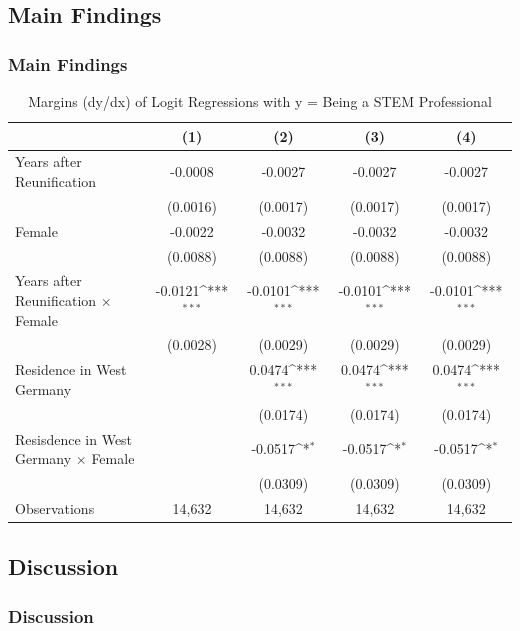 \documentclass[11pt, aspectratio=1610, xcolor={dvipsnames}]{beamer}
\def\sym#1{\ifmmode^{#1}\else\(^{#1}\)\fi}
\begin{document}
	\subsection{Main Findings}
	\begin{frame}
		\frametitle{Main Findings}
		
		{\linespread{1}\tiny
			\begin{table}[h]
				\centering
				\caption{Margins (dy/dx) of Logit Regressions with y = Being a STEM Professional}
				\label{tab:margins}
				\begin{tabular}{l*{4}{c}}
					\toprule
					&\multicolumn{1}{c}{(1)} & \multicolumn{1}{c}{(2)}         &\multicolumn{1}{c}{(3)} & \multicolumn{1}{c}{(4)} \\
					\midrule
					Years after Reunification & -0.0008 & -0.0027 & -0.0027 & -0.0027 \\
					& (0.0016) & (0.0017) & (0.0017) & (0.0017) \\
					\addlinespace
					Female & -0.0022  & -0.0032 & -0.0032 & -0.0032 \\
					& (0.0088) & (0.0088) & (0.0088) & (0.0088) \\
					\addlinespace
					Years after Reunification $\times$ Female &     -0.0121\sym{***}&     -0.0101\sym{***}&     -0.0101\sym{***} &     -0.0101\sym{***}\\
					&    (0.0028)         &    (0.0029)         &    (0.0029)         &    (0.0029) \\
					\addlinespace
					Residence in West Germany&                     &      0.0474\sym{***}&      0.0474\sym{***}&      0.0474\sym{***}\\
					&                     &    (0.0174)         &    (0.0174)         &    (0.0174)         \\
					\addlinespace
					Resisdence in West Germany $\times$ Female         &                     &     -0.0517\sym{*} & -0.0517\sym{*} & -0.0517\sym{*} \\
					& &    (0.0309)         &    (0.0309)         &    (0.0309) \\
					\midrule
					Observations        &       14,632         &       14,632         &       14,632         &       14,632         \\
					\bottomrule
				\end{tabular}
			\end{table}
		}
		
	\end{frame}
		
	\subsection{Discussion}
	\begin{frame}
		\frametitle{Discussion}
	\end{frame}
	
\end{document}

